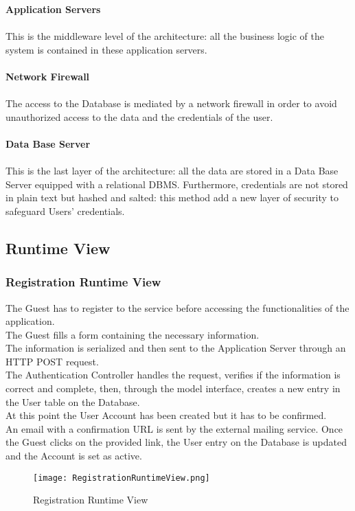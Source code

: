 \noindent
\textbf{Application Servers} \\ \\
This is the middleware level of the architecture: all the business logic of the system is contained in these application servers.
\\ \\
\textbf{Network Firewall} \\ \\
The access to the Database is mediated by a network firewall in order to avoid unauthorized access to the data and the credentials of the user. 
\\ \\
\textbf{Data Base Server} \\ \\
This is the last layer of the architecture: all the data are stored in a Data Base Server equipped with a relational DBMS.
Furthermore, credentials are not stored in plain text but hashed and salted: this method add a new layer of security to safeguard Users' credentials.

\subsection{Runtime View}

\subsubsection{Registration Runtime View}

The Guest has to register to the service before accessing the functionalities of the application.\\
The Guest fills a form containing the necessary information.\\
The information is serialized and then sent to the Application Server through an HTTP POST request.\\
The Authentication Controller handles the request, verifies if the information is correct and complete, then, through the model interface, creates a new entry in the User table on the Database.\\
At this point the User Account has been created but it has to be confirmed. \\
An email with a confirmation URL is sent by the external mailing service. Once the Guest clicks on the provided link, the User entry on the Database is updated and the Account is set as active.

\begin{figure}[H]
	\centering
	\texttt{[image: RegistrationRuntimeView.png]}
	\caption{Registration Runtime View}
\end{figure}
\newpage
